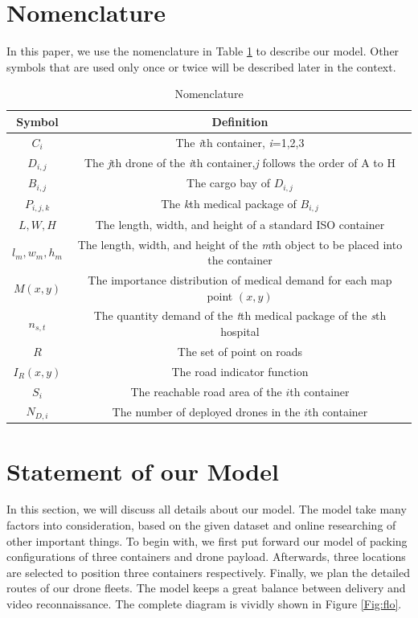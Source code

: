 \documentclass{mcmthesis}
\begin{document}
\section{Nomenclature}\label{Sec:nome}
In this paper, we use the nomenclature in Table \ref{Tab:nome} to describe our model. Other symbols that are used only once or twice will be described later in the context.
\begin{table}[htbp]
    \centering
    \caption{Nomenclature}
    \label{Tab:nome}
    \linespread{1.5}
    \begin{tabular}{c c}
\toprule
    	Symbol & Definition\\
\midrule
	$C_i$ & The \emph{i}th container, \emph{i}=1,2,3\\
	$D_{i,j}$ & The \emph{j}th drone of the \emph{i}th container,\emph{j} follows the order of A to H\\
	$B_{i,j}$ & The cargo bay of $D_{i,j}$\\
	$P_{i,j,k}$ & The \emph{k}th medical package of $B_{i,j}$\\
	$L,W,H$ & The length, width, and height of a standard ISO container\\
	$l_m,w_m,h_m$ & The length, width, and height of the \emph{m}th object to be placed into the container\\
	$M(x,y)$ & The importance distribution of medical demand for each map point $(x,y)$\\
    $n_{s,t}$ & The quantity demand of the \emph{t}th medical package of the \emph{s}th hospital\\
    $R$ & The set of point on roads\\
    $I_R(x, y)$ & The road indicator function \\ 
    $S_i$ & The reachable road area of the $i$th container \\
    $N_{D,i}$ & The number of deployed drones in the $i$th container\\
	
\bottomrule
    \end{tabular}
\end{table}


\section{Statement of our Model}\label{Sec:stat}

In this section, we will discuss all details about our model. The model take many factors into consideration, based on the given dataset and online researching of other important things. To begin with, we first put forward our model of packing configurations of three containers and drone payload. Afterwards, three locations are selected to position three containers respectively. Finally, we plan the detailed routes of our drone fleets. The model keeps a great balance between delivery and video reconnaissance\cite{IEEEConference}. The complete diagram is vividly shown in Figure \ref{Fig:flo}.
\end{document}
